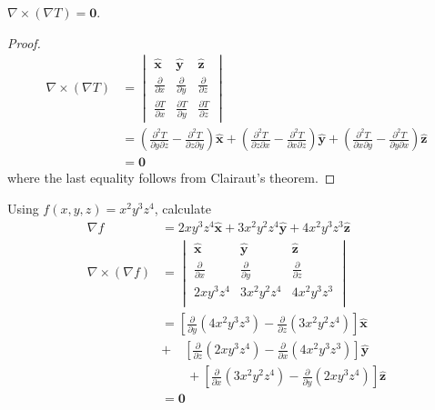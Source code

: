 \documentclass[a4paper]{article}
\begin{document}

\( \nabla \times \!\left( \nabla T \right) = \pmb{0} \).
\begin{proof}[Proof]
\begin{align*}
	\nabla \times \!\left( \nabla T \right) & = \begin{vmatrix}
		\pmb{\hat{x}} & \pmb{\hat{y}} & \pmb{\hat{z}} \\[3pt]
		\frac{\partial }{\partial x} & \frac{\partial }{\partial y} & \frac{\partial }{\partial z} \\[6pt]
		\frac{\partial T}{\partial x} & \frac{\partial T}{\partial y} & \frac{\partial T}{\partial z}
	\end{vmatrix} \\
	 & = \!\left( \frac{\partial^{2}T}{\partial y \partial z} - \frac{\partial^{2}T}{\partial z \partial y} \right)\pmb{\hat{x}} + \!\left( \frac{\partial^{2}T}{\partial z \partial x} - \frac{\partial^{2}T}{\partial x \partial z} \right)\pmb{\hat{y}} + \!\left( \frac{\partial^{2}T}{\partial x \partial y} - \frac{\partial^{2}T}{\partial y \partial x} \right)\pmb{\hat{z}} \\
	 & = \pmb{0}
\end{align*}
where the last equality follows from Clairaut's theorem.
\end{proof}
Using \( f \!\left( x,y,z \right) = x^{2}y^{3}z^{4} \), calculate
\begin{align*}
	\nabla f & = 2xy^{3}z^{4}\pmb{\hat{x}} + 3x^{2}y^{2}z^{4}\pmb{\hat{y}} + 4x^{2}y^{3}z^{3}\pmb{\hat{z}} \\
	\nabla \times \!\left( \nabla f \right) & = \begin{vmatrix}
		\pmb{\hat{x}} & \pmb{\hat{y}} & \pmb{\hat{z}} \\[3pt]
		\frac{\partial }{\partial x} & \frac{\partial }{\partial y} & \frac{\partial }{\partial z} \\[6pt]
		2xy^{3}z^{4} & 3x^{2}y^{2}z^{4} & 4x^{2}y^{3}z^{3} \\
	\end{vmatrix} \\
						& = \!\left[ \frac{\partial }{\partial y}\!\left( 4x^{2}y^{3}z^{3} \right) - \frac{\partial }{\partial z}\!\left( 3x^{2}y^{2}z^{4} \right) \right]\pmb{\hat{x}} \\
						& + \quad \!\left[ \frac{\partial }{\partial z}\!\left( 2xy^{3}z^{4} \right) - \frac{\partial }{\partial x}\!\left( 4x^{2}y^{3}z^{3} \right) \right]\pmb{\hat{y}} \\
						& \qquad + \!\left[ \frac{\partial }{\partial x}\!\left( 3x^{2}y^{2}z^{4} \right) - \frac{\partial }{\partial y}\!\left( 2xy^{3}z^{4} \right) \right]\pmb{\hat{z}} \\
						& = \pmb{0}
\end{align*}
\end{document}
